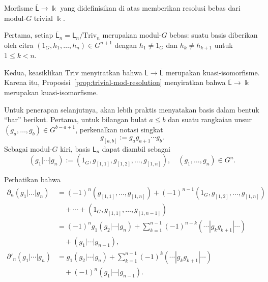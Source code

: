 \begin{proposisi}\label{prop:trivial-mod-nor-resolution}
	Morfisme $\overline{\mathsf{L}}\to\Bbbk$ yang didefinisikan di atas
	memberikan resolusi bebas dari modul-$G$ trivial $\Bbbk$.
\end{proposisi}

\begin{bukti}
	Pertama, setiap
	$\overline{\mathsf{L}}_n=\mathsf{L}_n/\mathrm{Triv}_n$ merupakan modul-$G$
	bebas: suatu basis diberikan oleh citra
	$(1_G,h_1,\ldots,h_n)\in G^{n+1}$ dengan $h_1\neq1_G$ dan
	$h_k\neq h_{k+1}$ untuk $1\leq k<n$.

	Kedua, keasiklikan $\mathrm{Triv}$ menyiratkan bahwa
	$\mathsf{L}\to\overline{\mathsf{L}}$ merupakan kuasi-isomorfisme. Karena
	itu, Proposisi~\ref{prop:trivial-mod-resolution} menyiratkan bahwa
	$\overline{\mathsf{L}}\to\Bbbk$ merupakan kuasi-isomorfisme.
\end{bukti}

Untuk penerapan selanjutnya, akan lebih praktis menyatakan basis dalam bentuk
``bar'' berikut. Pertama, untuk bilangan bulat $a\leq b$ dan suatu rangkaian
unsur $(g_a,\ldots,g_b)\in G^{b-a+1}$, perkenalkan notasi singkat
\[ g_{[a, b]} := g_a g_{a+1} \cdots g_b. \]
Sebagai modul-$G$ kiri, basis $\mathsf{L}_n$ dapat diambil sebagai
\begin{equation}\label{eqn:L-basis}
	(g_1 | \cdots | g_n) := \left( 1_G, g_{[1, 1]}, g_{[1, 2]}, \ldots, g_{[1, n]} \right), \quad (g_1, \ldots, g_n) \in G^n.
\end{equation}

Perhatikan bahwa
\begin{equation}\label{eqn:L-basis-partial}\begin{aligned}
	\partial_n (g_1 | \ldots | g_n) & = (-1)^n \left( g_{[1, 1]}, \ldots, g_{[1, n]}\right) + (-1)^{n-1} \left(1_G, g_{[1, 2]}, \ldots, g_{[1, n]}\right) \\
	& \quad + \cdots + \left( 1_G, g_{[1, 1]}, \ldots, g_{[1, n-1]}\right) \\
	& = (-1)^n g_1 (g_2 | \cdots | g_n) + \sum_{k=1}^{n-1} (-1)^{n-k} (\cdots | g_k g_{k+1}| \cdots) \\
	& \quad + (g_1 | \cdots |g_{n-1}), \\
	\partial'_n(g_1 | \cdots | g_n) & = g_1 (g_2 | \cdots | g_n) + \sum_{k=1}^{n-1} (-1)^k (\cdots | g_k g_{k+1}| \cdots) \\
	& \quad + (-1)^n (g_1 | \cdots |g_{n-1}).
\end{aligned}\end{equation}

